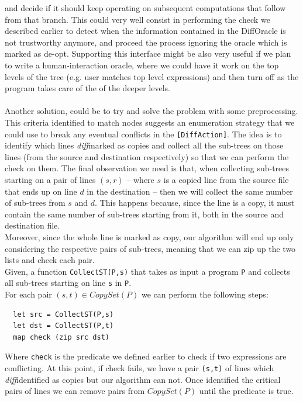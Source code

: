 \documentclass[11pt, titlepage]{article}
\newcommand{\toHaskell}[1]{\texttt{#1}\xspace}
\newcommand{\diff}{\emph{diff}}
\begin{document}
and decide if it should keep operating on subsequent computations that follow from that branch.
This could very well consist in performing the check we described earlier to detect when the information contained in the DiffOracle is not trustworthy anymore, and proceed the process ignoring the oracle which is marked as de-opt. 
Supporting this interface might be also very useful if we plan to write a human-interaction oracle, where we could have it work on the top levels of the tree (e.g. user matches top level expressions) and then turn off as the program takes care of the of the deeper levels. 
\\
\\
Another solution, could be to try and solve the problem with some preprocessing.
\\
This criteria identified to match nodes suggests an enumeration strategy that we could use to break any eventual conflicts in the \texttt{[DiffAction]}. 
The idea is to identify which lines \diff marked as copies and collect all the sub-trees on those lines (from the source and destination respectively) so that we can perform the check on them.
The final observation we need is that, when collecting sub-trees starting on a pair of lines $(s,r)$ -- where $s$ is a copied line from the source file that ends up on line $d$ in the destination -- then we will collect the same number of sub-trees from $s$ and $d$. 
This happens because, since the line is a copy, it must contain the same number of sub-trees starting from it, both in the source and destination file. 
\\
Moreover, since the whole line is marked as copy, our algorithm will end up only considering the respective pairs of sub-trees, meaning that we can zip up the two lists and check each pair. 
\\
Given, a function \toHaskell{CollectST(P,s)} that takes as input a program \toHaskell{P} and collects all sub-trees starting on line \toHaskell{s} in \toHaskell{P}. 
\\
For each pair $(s,t) \in CopySet(P)$ we can perform the following steps:
\begin{verbatim}
  let src = CollectST(P,s)
  let dst = CollectST(P,t)
  map check (zip src dst) 
\end{verbatim}

Where \texttt{check} is the predicate we defined earlier to check if two expressions are conflicting.
At this point, if check fails, we have a pair \texttt{(s,t)} of lines which \diff identified as copies but our algorithm can not. 
Once identified the critical pairs of lines we can remove pairs from $CopySet(P)$ until the predicate is true. 
\end{document}
